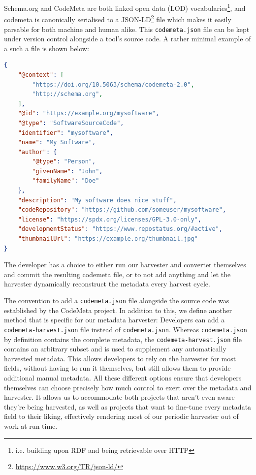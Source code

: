 \documentclass[a4paper,11pt]{article}
\begin{document}
Schema.org and CodeMeta are both linked open data (LOD)
vocabularies\footnote{i.e. building upon RDF and being retrievable over HTTP},
and codemeta is canonically serialised to a
JSON-LD\footnote{\url{https://www.w3.org/TR/json-ld/}} file which makes it
easily parsable for both machine and human alike. This \texttt{codemeta.json}
file can be kept under version control alongside a tool's source code. A 
rather minimal example of a such a file is shown below:

\begin{lstlisting}[language=json] 
{
    "@context": [
        "https://doi.org/10.5063/schema/codemeta-2.0",
        "http://schema.org",
    ],
    "@id": "https://example.org/mysoftware",
    "@type": "SoftwareSourceCode",
    "identifier": "mysoftware",
    "name": "My Software",
    "author": {
        "@type": "Person", 
        "givenName": "John",
        "familyName": "Doe"
    },
    "description": "My software does nice stuff",
    "codeRepository": "https://github.com/someuser/mysoftware",
    "license": "https://spdx.org/licenses/GPL-3.0-only",
    "developmentStatus": "https://www.repostatus.org/#active",
    "thumbnailUrl": "https://example.org/thumbnail.jpg"
}
\end{lstlisting}

The developer has a choice to either run our harvester and converter themselves and
commit the resulting codemeta file, or to not add anything and let the harvester
dynamically reconstruct the metadata every harvest cycle.

The convention to add a \texttt{codemeta.json} file alongside the source code
was established by the CodeMeta project. In addition to this, we define another
method that is specific for our metadata harvester: Developers can add a
\texttt{codemeta-harvest.json} file instead of \texttt{codemeta.json}. Whereas
\texttt{codemeta.json} by definition contains the complete metadata, the
\texttt{codemeta-harvest.json} file contains an arbitrary subset and is used to
supplement any automatically harvested metadata. This allows developers to rely
on the harvester for most fields, without having to run it themselves, but
still allows them to provide additional manual metadata. All these different
options ensure that developers themselves can choose precisely how much control
to exert over the metadata and harvester. It allows us to accommodate both
projects that aren't even aware they're being harvested, as well as projects
that want to fine-tune every metadata field to their liking, effectively
rendering most of our periodic harvester out of work at run-time.
\end{document}
